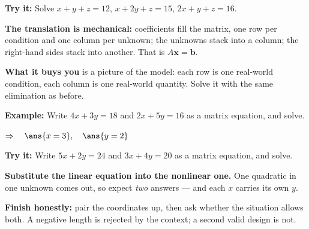 \documentclass[12pt]{article}
\begin{document}
\begin{tryitbox}
\textbf{Try it:} \quad Solve $x + y + z = 12$, $x + 2y + z = 15$, $2x + y + z = 16$.\\[2pt]
\end{tryitbox}


\begin{formulabox}
\textbf{The translation is mechanical:} coefficients fill the matrix, one row per condition
and one column per unknown; the unknowns stack into a column; the right-hand sides stack
into another. That is $A\mathbf{x} = \mathbf{b}$.\par
\textbf{What it buys you} is a picture of the model: each row is one real-world condition,
each column is one real-world quantity. Solve it with the same elimination as before.
\end{formulabox}

\begin{examplebox}
\textbf{Example:} \quad Write $4x + 3y = 18$ and $2x + 5y = 16$ as a matrix equation, and solve.

$\Rightarrow\quad \ans{x = 3}, \quad \ans{y = 2}$
\end{examplebox}

\begin{tryitbox}
\textbf{Try it:} \quad Write $5x + 2y = 24$ and $3x + 4y = 20$ as a matrix equation, and solve.\\[2pt]
\end{tryitbox}


\begin{formulabox}
\textbf{Substitute the linear equation into the nonlinear one.} One quadratic in one unknown
comes out, so expect \emph{two} answers --- and each $x$ carries its own $y$.\par
\textbf{Finish honestly:} pair the coordinates up, then ask whether the situation allows
both. A negative length is rejected by the context; a second valid design is not.
\end{formulabox}
\end{document}
